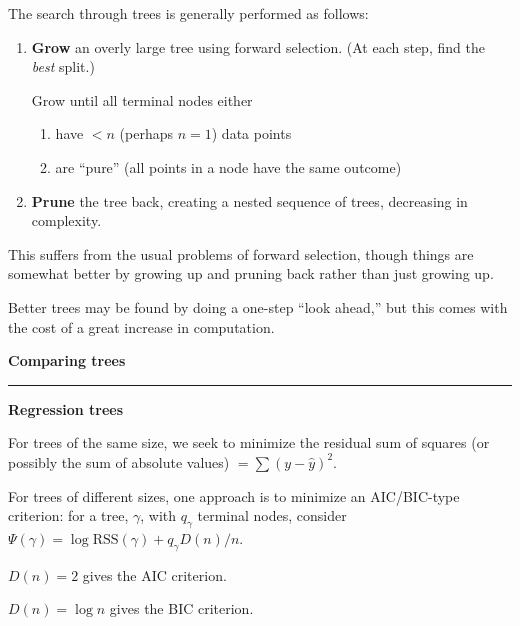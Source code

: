 \documentclass[12pt,letterpaper]{article}
\newcommand{\HRule}{\rule{\linewidth}{4pt}}
\newcommand{\hspone}{\hspace*{1cm}}
\newcommand{\vsphalf}{\vspace*{0.5cm}}
\newcommand{\vspone}{\vspace*{1cm}}
\begin{document}
The search through trees is generally performed as follows:
\begin{enumerate}
\item \textbf{Grow} an overly large tree using forward selection.
(At each step, find the \emph{best\/} split.)  

Grow until all terminal nodes either 
\begin{enumerate}
\item have $< n$ (perhaps $n=1$) data points
\item are ``pure'' (all points in a node have the same outcome)
\end{enumerate}

\item \textbf{Prune} the tree back, creating a nested sequence of
  trees, decreasing in complexity.

\end{enumerate}

\vspone

This suffers from the usual problems of forward selection, though
things are somewhat better by growing up and pruning back rather than
just growing up.

\vsphalf

Better trees may be found by doing a one-step ``look ahead,'' but this
comes with the cost of a great increase in computation.



\newpage

\fontsize{30}{30} \selectfont

\centerline{\textbf{Comparing trees}}

\HRule

\vsphalf

\fontsize{20}{25} \selectfont


\textbf{Regression trees}

\vsphalf

For trees of the same size, we seek to minimize the residual sum of
squares (or possibly the sum of absolute values) $= \sum (y -
\hat{y})^2$.

\vsphalf

For trees of different sizes, one approach is to minimize an
AIC/BIC-type criterion: for a tree, $\gamma$, with $q_\gamma$ terminal
nodes, consider $\Psi(\gamma) = \log \text{RSS}(\gamma) + q_\gamma
D(n) /n $.

\hspone $D(n) = 2$ gives the AIC criterion.

\hspone $D(n) = \log n$ gives the BIC criterion.
\end{document}
